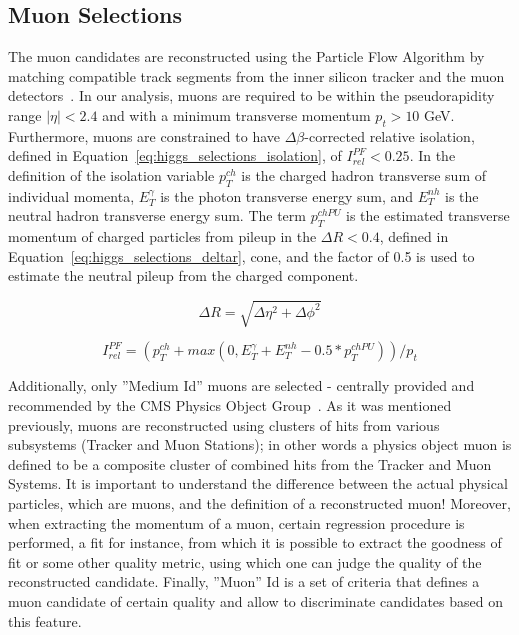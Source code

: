 \subsection{Muon Selections}
The muon candidates are reconstructed using the Particle Flow Algorithm by matching compatible track segments from the inner silicon tracker and the muon detectors~\cite{Chatrchyan:2012xi}. In our analysis, muons are required to be  within the pseudorapidity range $|\eta|<2.4$ and with a minimum transverse momentum $p_{t}>10$ GeV. Furthermore, muons are constrained to have $\Delta \beta$-corrected relative isolation, defined in Equation~\ref{eq:higgs_selections_isolation}, of $I_{rel}^{PF}<0.25$. In the definition of the isolation variable $p_{T}^{ch}$ is the charged hadron transverse sum of individual momenta, $E_{T}^{\gamma}$ is the photon transverse energy sum, and $E_{T}^{nh}$ is the neutral hadron transverse energy sum. The term $p_{T}^{chPU}$ is the estimated transverse momentum of charged particles from pileup in the $\Delta R < 0.4$, defined in Equation~\ref{eq:higgs_selections_deltar}, cone, and the factor of 0.5 is used to estimate the neutral pileup from the charged component.
\begin{center}
   \begin{equation}
      \label{eq:higgs_selections_deltar}
      {\Delta R} = {\sqrt{\Delta\eta^{2}+\Delta\phi^{2}}}
   \end{equation}
\end{center}
\begin{center}
   \begin{equation}
      \label{eq:higgs_selections_isolation}
      {I_{rel}^{PF}} = {(p_{T}^{ch}+max(0,E_{T}^{\gamma}+E_{T}^{nh}-0.5*p_{T}^{chPU}))/p_{t}}
   \end{equation}
\end{center}

Additionally, only ''Medium Id'' muons are selected - centrally provided and recommended by the CMS Physics Object Group~\cite{CMSMuonPOG,CMSMuonId}. As it was mentioned previously, muons are reconstructed using clusters of hits from various subsystems (Tracker and Muon Stations); in other words a physics object muon is defined to be a composite cluster of combined hits from the Tracker and Muon Systems. It is important to understand the difference between the actual physical particles, which are muons, and the definition of a reconstructed muon! Moreover, when extracting the momentum of a muon, certain regression procedure is performed, a fit for instance, from which it is possible to extract the goodness of fit or some other quality metric, using which one can judge the quality of the reconstructed candidate. Finally, ''Muon'' Id is a set of criteria that defines a muon candidate of certain quality and allow to discriminate candidates based on this feature.

